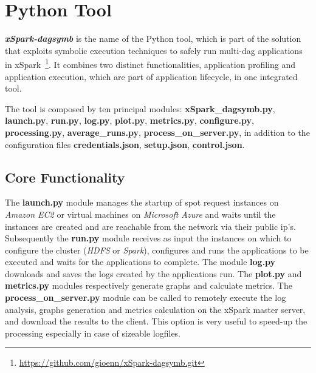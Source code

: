 
\section{Python Tool}\label{sec:xspark_dagsymb}

\textbf\textit{xSpark-dagsymb} is the name of the Python tool, which is part of the \tool solution that exploits symbolic execution techniques to safely run multi-dag applications in xSpark~\footnote{\url{https://github.com/gioenn/xSpark-dagsymb.git}}.
It combines two distinct functionalities, application profiling and
application execution, which are part of \tool application lifecycle, in one integrated tool.

The tool is composed by ten principal modules:
\textbf{xSpark\_dagsymb.py}, \textbf{launch.py}, \textbf{run.py},
\textbf{log.py}, \textbf{plot.py}, \textbf{metrics.py},
\textbf{configure.py}, \textbf{processing.py},
\textbf{average\_runs.py}, \textbf{process\_on\_server.py}, in addition
to the configuration files \textbf{credentials.json},
\textbf{setup.json}, \textbf{control.json}.

\hypertarget{core-functionality}{%
\subsection{Core Functionality}\label{core-functionality}}

The \textbf{launch.py} module manages the startup of spot request
instances on \emph{Amazon EC2} or virtual machines on \emph{Microsoft
Azure} and waits until the instances are created and are reachable from
the network via their public ip's. Subsequently the \textbf{run.py}
module receives as input the instances on which to configure the cluster
(\emph{HDFS} or \emph{Spark}), configures and runs the applications to
be executed and waits for the applications to complete. The module
\textbf{log.py} downloads and saves the logs created by the applications
run. The \textbf{plot.py} and \textbf{metrics.py} modules respectively
generate graphs and calculate metrics. The
\textbf{process\_on\_server.py} module can be called to remotely execute
the log analysis, graphs generation and metrics calculation on the
xSpark master server, and download the results to the client. This
option is very useful to speed-up the processing especially in case of
sizeable logfiles.

